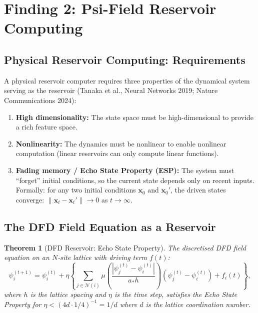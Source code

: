 \documentclass[11pt]{article}
\newtheorem{theorem}{Theorem}[section]
\theoremstyle{definition}
\theoremstyle{remark}
\begin{document}
\section{Finding 2: Psi-Field Reservoir Computing}
\label{sec:reservoir-computing}

\subsection{Physical Reservoir Computing: Requirements}
\label{sec:prc-requirements}

A physical reservoir computer requires three properties of the dynamical
system serving as the reservoir (Tanaka et al., Neural Networks 2019;
Nature Communications 2024):

\begin{enumerate}
\item \textbf{High dimensionality:} The state space must be
  high-dimensional to provide a rich feature space.
\item \textbf{Nonlinearity:} The dynamics must be nonlinear to enable
  nonlinear computation (linear reservoirs can only compute linear
  functions).
\item \textbf{Fading memory / Echo State Property (ESP):} The system
  must ``forget'' initial conditions, so the current state depends only
  on recent inputs. Formally: for any two initial conditions $\mathbf{x}_0$
  and $\mathbf{x}_0'$, the driven states converge:
  $\|\mathbf{x}_t - \mathbf{x}_t'\| \to 0$ as $t \to \infty$.
\end{enumerate}

\subsection{The DFD Field Equation as a Reservoir}
\label{sec:dfd-reservoir}

\begin{theorem}[DFD Reservoir: Echo State Property]
\label{thm:dfd-esp}
The discretised DFD field equation on an $N$-site lattice with driving
term $f(t)$:
\begin{equation}
  \psi_i^{(t+1)} = \psi_i^{(t)} + \eta \left\{
  \sum_{j \in \mathcal{N}(i)} \mu\!\left(\frac{|\psi_j^{(t)} - \psi_i^{(t)}|}{a_* h}\right)
  (\psi_j^{(t)} - \psi_i^{(t)}) + f_i(t)\right\},
  \label{eq:discrete-dfd}
\end{equation}
where $h$ is the lattice spacing and $\eta$ is the time step, satisfies
the Echo State Property for $\eta < (4d \cdot 1/4)^{-1} = 1/d$ where
$d$ is the lattice coordination number.
\end{theorem}
\end{document}
